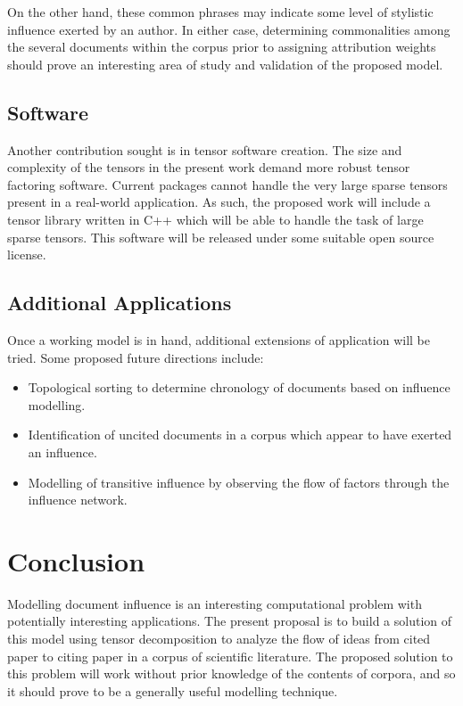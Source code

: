 \documentclass{article}
\begin{document}
On the other hand, these common phrases may indicate some level of
stylistic influence exerted by an author.  In either case, determining
commonalities among the several documents within the corpus prior to
assigning attribution weights should prove an interesting area of
study and validation of the proposed model.

\subsection{Software}
Another contribution sought is in tensor software creation.  The size
and complexity of the tensors in the present work demand more robust
tensor factoring software.  Current packages cannot handle the very
large sparse tensors present in a real-world application.  As such,
the proposed work will include a tensor library written in C++ which
will be able to handle the task of large sparse tensors.  This
software will be released under some suitable open source license.

\subsection{Additional Applications}
Once a working model is in hand, additional extensions of application
will be tried. Some proposed future directions include:
\begin{itemize}
    \item Topological sorting to determine chronology of documents
    based on influence modelling.
    \item Identification of uncited documents in a corpus which appear
    to have exerted an influence.
    \item Modelling of transitive influence by observing the flow of
    factors through the influence network.
\end{itemize}


\section{Conclusion}
Modelling document influence is an interesting computational problem
with potentially interesting applications.  The present proposal is to
build a solution of this model using tensor decomposition to analyze
the flow of ideas from cited paper to citing paper in a corpus of
scientific literature.  The proposed solution to this problem will
work without prior knowledge of the contents of corpora, and so it
should prove to be a generally useful modelling technique.


{}

\end{document}
